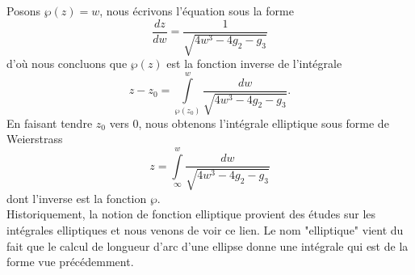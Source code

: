 \documentclass[a4paper]{article}
\begin{document}
\begin{rem} 
\normalfont
\noindent Posons $\wp(z)=w$, nous écrivons l'équation sous la forme
\begin{equation*}
\frac{dz}{dw}=\frac{1}{\sqrt{4w^3-4g_{2}-g_{3}}}
\end{equation*}
d'où nous concluons que $\wp(z)$ est la fonction inverse de l'intégrale 
\begin{equation*}
z-z_{0}=\int \limits_{\wp(z_{0})}^{w} \frac{dw}{\sqrt{4w^3-4g_{2}-g_{3}}}.
\end{equation*}
En faisant tendre $z_{0}$ vers $0$, nous obtenons l'intégrale elliptique sous forme de Weierstrass
\begin{equation*}
z=\int \limits_{\infty}^{w} \frac{dw}{\sqrt{4w^3-4g_{2}-g_{3}}}
\end{equation*}
dont l'inverse est la fonction $\wp$. \\
Historiquement, la notion de fonction elliptique provient des études sur les intégrales elliptiques et nous venons de voir ce lien. Le nom "elliptique" vient du fait que le calcul de longueur d'arc d'une ellipse donne une intégrale qui est de la forme vue précédemment.
\end{rem}
\end{document}
